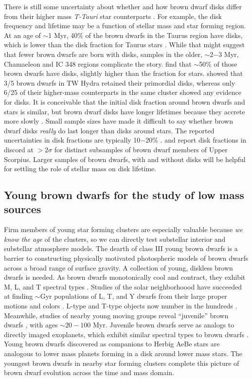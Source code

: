 There is still some uncertainty about whether and how brown dwarf disks differ from their higher mass \emph{T-Tauri} star counterparts \citep{2009ApJ...696..143P}.  For example, the disk frequency and lifetime may be a function of stellar mass and star forming region.  At an age of $\sim$1 Myr, 40\% of the brown dwarfs in the Taurus region have disks, which is lower than the disk fraction for Taurus stars \citep{2006ApJ...645..676L}.  While that might suggest that fewer brown dwarfs are born with disks, samples in the older, $\sim$2$-$3 Myr, Chamaeleon and IC 348 regions complicate the story.  \cite{2005ApJ...631L..69L} find that $\sim$50\% of those brown dwarfs have disks, slightly higher than the fraction for stars.  \citet{2008ApJ...681.1584R} showed that 3/5 brown dwarfs in TW Hydra retained their primordial disks, whereas only 6/25 of their higher-mass counterparts in the same cluster showed any evidence for disks.  It is conceivable that the initial disk fraction around brown dwarfs and stars is similar, but brown dwarf disks have longer lifetimes because they accrete more slowly \citep{2007ApJ...657..511A}.  Small sample sizes have made it difficult to say whether brown dwarf disks \emph{really} do last longer than disks around stars.  The reported uncertainties in disk fractions are typically 10$-$20\% \citep{2012MNRAS.420.2497R}.  \citet{2007ApJ...660.1517S} and \citet{2009ApJ...705.1173R} report disk fractions in discord at $>2\sigma$ for distinct subsamples of brown dwarf members of Upper Scorpius.  Larger samples of brown dwarfs, with and without disks will be helpful for settling the role of stellar mass on disk lifetime.  

\subsection{Young brown dwarfs for the study of low mass sources}
Firm members of young star forming clusters are especially valuable because \emph{we know the age} of the clusters, so we can directly test substellar interior and substellar atmosphere models.  The dearth of class III young brown dwarfs is a barrier to constructing physically motivated photospheric models of brown dwarfs across a broad range of surface gravity.  A collection of young, diskless brown dwarfs is needed.  As brown dwarfs monotonically cool and contract, they exhibit M, L, and T spectral types \citep{2012ApJS..201...19D}.  Studies of the solar neighborhoood have succeeded at finding $\sim$Gyr populations of L, T, and Y dwarfs from their large proper motions and colors \citep{2011ApJS..197...19K}.  L-type and T-type objects now number in the hundreds \citep{2010AJ....139.1808S,2011ApJS..197...19K}.  Meanwhile, studies of nearby young moving groups reveal ``juvenile'' brown dwarfs \citep{2013ApJ...772...79A}, with ages $\sim20-100$ Myr.  Juvenile brown dwarfs serve as analogs to directly imaged exoplanets, which exhibit similar spectral types to brown dwarfs \citep{2015ApJ...798L...3C}.  Young brown dwarfs discovered as companions to Herbig AeBe stars are analogous to lower mass planets forming in a disk around lower mass stars.  The youngest brown dwarfs in nearby star forming clusters complete this picture of brown dwarf evolution across the time and mass domain.

